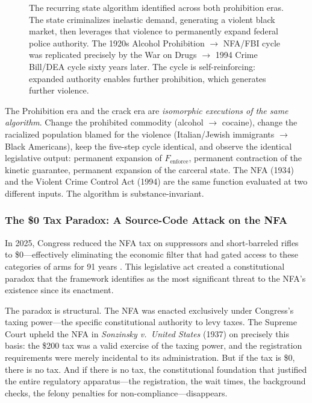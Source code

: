 \begin{figure}[htbp]
\caption{The recurring state algorithm identified across both prohibition eras. The state criminalizes inelastic demand, generating a violent black market, then leverages that violence to permanently expand federal police authority. The 1920s Alcohol Prohibition $\rightarrow$ NFA/FBI cycle was replicated precisely by the War on Drugs $\rightarrow$ 1994 Crime Bill/DEA cycle sixty years later. The cycle is self-reinforcing: expanded authority enables further prohibition, which generates further violence.}
\label{fig:prohibition-algorithm}
\end{figure}

\begin{keyinsight}
The Prohibition era and the crack era are \textit{isomorphic executions of the same algorithm}. Change the prohibited commodity (alcohol $\rightarrow$ cocaine), change the racialized population blamed for the violence (Italian/Jewish immigrants $\rightarrow$ Black Americans), keep the five-step cycle identical, and observe the identical legislative output: permanent expansion of $F_{\text{enforce}}$, permanent contraction of the kinetic guarantee, permanent expansion of the carceral state. The NFA (1934) and the Violent Crime Control Act (1994) are the same function evaluated at two different inputs. The algorithm is substance-invariant.
\end{keyinsight}

\subsubsection{The \$0 Tax Paradox: A Source-Code Attack on the NFA}

In 2025, Congress reduced the NFA tax on suppressors and short-barreled rifles to \$0---effectively eliminating the economic filter that had gated access to these categories of arms for 91 years \cite{nfataxzero}. This legislative act created a constitutional paradox that the framework identifies as the most significant threat to the NFA's existence since its enactment.

The paradox is structural. The NFA was enacted exclusively under Congress's taxing power---the specific constitutional authority to levy taxes. The Supreme Court upheld the NFA in \textit{Sonzinsky v.\ United States} (1937) on precisely this basis: the \$200 tax was a valid exercise of the taxing power, and the registration requirements were merely incidental to its administration. But if the tax is \$0, there is no tax. And if there is no tax, the constitutional foundation that justified the entire regulatory apparatus---the registration, the wait times, the background checks, the felony penalties for non-compliance---disappears.

